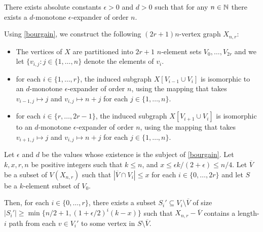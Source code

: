 \documentclass{patmorin}
\begin{document}
\begin{thm}[Bourgain]\label{bourgain}
    There exists absolute constants $\epsilon>0$ and $d>0$ such that for any $n\in\mathbb{N}$ there exists a  $d$-monotone $\epsilon$-expander of order $n$.
\end{thm}

Using \cref{bourgain}, we construct the following $(2r+1)n$-vertex graph $X_{n,r}$:
\begin{itemize}
  \item The vertices of $X$ are partitioned into $2r+1$ $n$-element sets $V_0,\ldots,V_{2r}$ and we let $\{v_{i,j}:j\in\{1,\ldots,n\}$ denote the elements of $v_i$.

  \item for each $i\in\{1,\ldots,r\}$, the induced subgraph $X[V_{i-1}\cup V_i]$ is isomorphic to an $d$-monotone $\epsilon$-expander of order $n$, using the mapping that takes $v_{i-1,j}\mapsto j$ and $v_{i,j}\mapsto n+j$ for each $j\in\{1,\ldots,n\}$.

  \item for each $i\in\{r,\ldots,2r-1\}$, the induced subgraph $X[V_{i+1}\cup V_i]$ is isomorphic to an $d$-monotone $\epsilon$-expander of order $n$, using the mapping that takes $v_{i+1,j}\mapsto j$ and $v_{i,j}\mapsto n+j$ for each $j\in\{1,\ldots,n\}$.
\end{itemize}

\begin{lem}\label{expansion}
  Let $\epsilon$ and $d$ be the values whose existence is the subject of \cref{bourgain}.  Let $k, x, r, n$ be positive integers such that $k\le n$, and $x\le \epsilon k/(2+\epsilon)\le n/4$.  Let $\overline{V}$ be a subset of $V(X_{n,r})$ such that $|\overline{V}\cap V_i|\le x$ for each $i\in\{0,\ldots,2r\}$ and let $S$ be a $k$-element subset of $V_0$.

  Then, for each $i\in\{0,\ldots,r\}$, there exists a subset $S_i'\subseteq V_i\setminus\overline{V}$ of size $|S_i'|\ge \min\{n/2+1,(1+\epsilon/2)^i (k-x)\}$ such that $X_{n,r}-\overline{V}$ contains a length-$i$ path from each $v\in V_i'$ to some vertex in $S\setminus\overline{V}$.
\end{lem}
\end{document}
